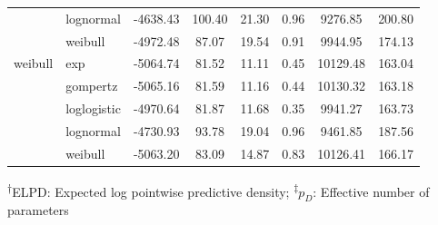 \documentclass[AMA,STIX1COL]{WileyNJD-v2}
\begin{document}
\begin{table}[H]
\begin{tabular}{l l c c c c c c}
 & lognormal & -4638.43 & 100.40 & 21.30 & 0.96 & 9276.85 & 200.80\\
 & weibull & -4972.48 & 87.07 & 19.54 & 0.91 & 9944.95 & 174.13\\
weibull & exp & -5064.74 & 81.52 & 11.11 & 0.45 & 10129.48 & 163.04\\
 & gompertz & -5065.16 & 81.59 & 11.16 & 0.44 & 10130.32 & 163.18\\
 & loglogistic & -4970.64 & 81.87 & 11.68 & 0.35 & 9941.27 & 163.73\\
 & lognormal & -4730.93 & 93.78 & 19.04 & 0.96 & 9461.85 & 187.56\\
 & weibull & -5063.20 & 83.09 & 14.87 & 0.83 & 10126.41 & 166.17\\
\bottomrule
\end{tabular}
\begin{tablenotes}%
\textsuperscript{$\dagger$}ELPD: Expected log pointwise predictive density;
\textsuperscript{$\ddagger$}$p_D$: Effective number of parameters
\end{tablenotes}
\end{table}
\end{document}
